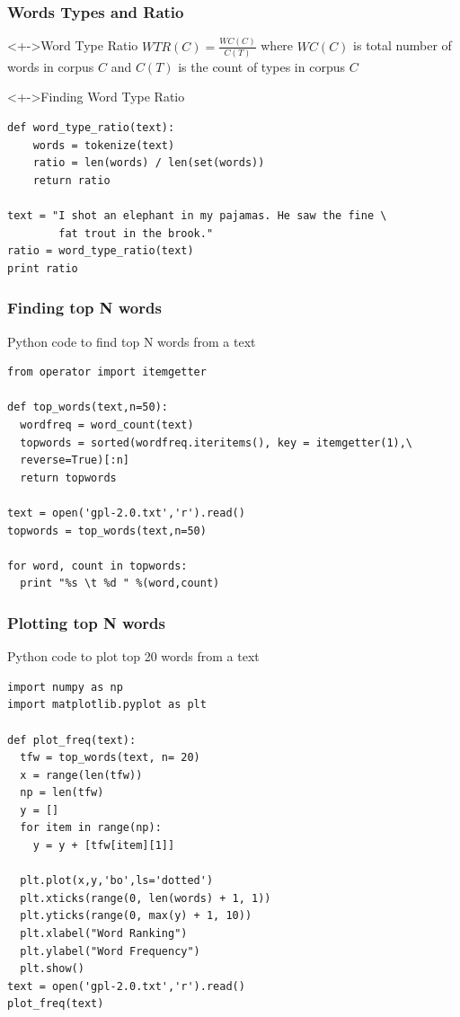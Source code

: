 \documentclass[serif,11pt,aspectratio=1610,table]{beamer}
\begin{document}
\begin{frame}[fragile]
 \frametitle{Words Types and Ratio}
 \begin{block}<+->{Word Type Ratio}
  $WTR(C) = \frac{WC(C)}{C(T)}$ where $WC(C)$ is total number of words in corpus $C$ and $C(T)$ is the count of types in corpus $C$
 \end{block}
\begin{block}<+->{Finding Word Type Ratio}
 \footnotesize
\begin{verbatim}
def word_type_ratio(text):
    words = tokenize(text)
    ratio = len(words) / len(set(words))
    return ratio

text = "I shot an elephant in my pajamas. He saw the fine \
        fat trout in the brook."
ratio = word_type_ratio(text)
print ratio
\end{verbatim}

\end{block}

\end{frame}

\begin{frame}[fragile]
 \frametitle{Finding top N words}
Python code to find top N words from a text
\footnotesize
\begin{verbatim}
from operator import itemgetter

def top_words(text,n=50):
  wordfreq = word_count(text)
  topwords = sorted(wordfreq.iteritems(), key = itemgetter(1),\
  reverse=True)[:n]
  return topwords

text = open('gpl-2.0.txt','r').read()
topwords = top_words(text,n=50)

for word, count in topwords:
  print "%s \t %d " %(word,count)
\end{verbatim}
\end{frame}

\begin{frame}[fragile]
 \frametitle{Plotting top N words}
Python code to plot top 20 words from a text
\footnotesize
\begin{verbatim}
import numpy as np
import matplotlib.pyplot as plt

def plot_freq(text):
  tfw = top_words(text, n= 20)
  x = range(len(tfw))
  np = len(tfw)
  y = []
  for item in range(np):
    y = y + [tfw[item][1]]

  plt.plot(x,y,'bo',ls='dotted')
  plt.xticks(range(0, len(words) + 1, 1))
  plt.yticks(range(0, max(y) + 1, 10))
  plt.xlabel("Word Ranking")
  plt.ylabel("Word Frequency")
  plt.show()
text = open('gpl-2.0.txt','r').read()
plot_freq(text)
\end{verbatim}

\end{frame}
\end{document}
